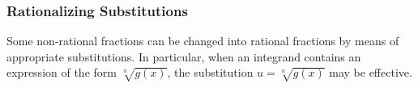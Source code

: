 \begin{frame}
\frametitle{Rationalizing Substitutions}
Some non-rational fractions can be changed into rational fractions by means of appropriate substitutions.  In particular, when an integrand contains an expression of the form $\sqrt[n]{g(x)}$, the substitution $u = \sqrt[n]{g(x)}$ may be effective.
\end{frame}
